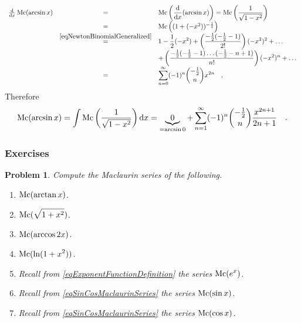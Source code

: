 \documentclass[12pt]{book}
\newtheorem{problem}[theorem]{Problem}
\begin{document}
\[
\begin{array}{rcl}
\frac{{\normalfont \text{d}}}{{\normalfont \text{d}} x}\operatorname{{\normalfont{Mc}}}(\arcsin{x})&=&\displaystyle \operatorname{{\normalfont{Mc}}} \left( \frac{{\normalfont \text{d}}}{{\normalfont \text{d}} x}(\arcsin{x})\right)= \operatorname{{\normalfont{Mc}}} \left( \frac{ 1}{ \sqrt{ 1-x^2 }}\right)\\
&=&
\operatorname{{\normalfont{Mc}}}\left( (1+(-x^2))^{-\frac{1}2}\right)\\
&\stackrel{\eqref{eqNewtonBinomialGeneralized}}{=}&\displaystyle 1-\frac{1}{2 }(- x^{2})+ \left(\frac{-\frac{1}{2}(-\frac{1}2-1)}{2!}\right)(-x^2)^2+ \dots\\
&&\displaystyle + \left(\frac{-\frac{1}{2}(-\frac{1}2-1)\dots (- \frac{1}2 -n+1) }{n!}\right)(-x^2)^n+\dots
\\
&=& \displaystyle\sum\limits_{n=0}^{\infty} (-1)^n \binom{-\frac{1}{2}}{n} x^{ 2n} \quad .
\end{array}
\]
Therefore
\[
\operatorname{{\normalfont{Mc}}}(\arcsin x)=\int \operatorname{{\normalfont{Mc}}}\left(\frac{1}{\sqrt{1-x^2}}\right) {\normalfont \text{d}} x =\underbrace{0}_{=\arcsin 0} +\sum_{n=1}^{\infty} (-1)^n \binom{-\frac{1}{2}}{n} \frac{x^{2n+1}}{2n+1}\quad .
\]

\subsubsection{Exercises}
\begin{problem}
Compute the Maclaurin series of the following.
\begin{multicols}{2}
\begin{enumerate}
\item $\displaystyle \operatorname{{\normalfont{Mc}}} (\arctan x) $.
\item $\displaystyle \operatorname{{\normalfont{Mc}}} (\sqrt{1+x^2})$.
\item $\displaystyle \operatorname{{\normalfont{Mc}}} (\arccos 2x)$.
\item $\displaystyle \operatorname{{\normalfont{Mc}}}(\ln (1+x^2))$.
\item Recall from \eqref{eqExponentFunctionDefinition} the series $\displaystyle \operatorname{{\normalfont{Mc}}} (e^x)$.
\item Recall from \eqref{eqSinCosMaclaurinSeries} the series $\displaystyle \operatorname{{\normalfont{Mc}}} (\sin x)$.
\item Recall from \eqref{eqSinCosMaclaurinSeries} the series $\displaystyle \operatorname{{\normalfont{Mc}}} (\cos x)$.
\end{enumerate}

\end{multicols}
\end{problem}
\end{document}
